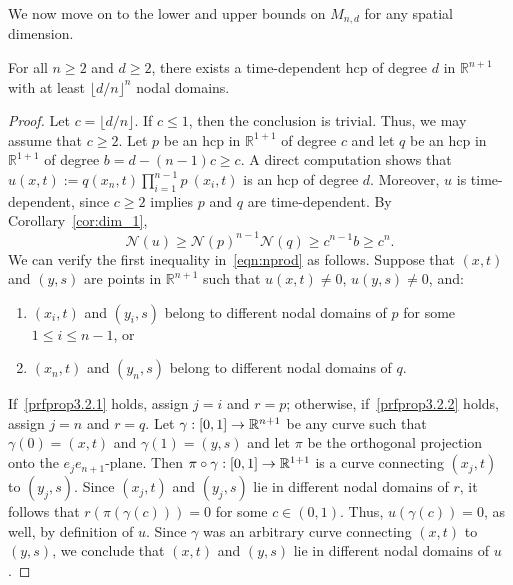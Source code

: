 \documentclass[10pt]{amsart}
\theoremstyle{definition}\newtheorem{defi}[theo]{Definition}\newtheorem{rema}[theo]{Remark}\newtheorem{exam}[theo]{Example}\newtheorem{exem}[theo]{Example}\newtheorem{nota}[theo]{Notation}
\newcommand{\R}{\mathbb{R}}
\newcommand{\nodal}{\mathcal{N}}
\newcommand*{\relabel}{
\renewcommand{\labelenumi}{(\theenumi)}}
\newcommand*{\alphenumi}{
\renewcommand*{\theenumi}{\alph{enumi}}\relabel}
\renewcommand*{\to}{\mathchoice{\longrightarrow}{\rightarrow}{\rightarrow}{\rightarrow}}
\begin{document}
We now move on to the lower and upper bounds on $M_{n,d}$ for any spatial dimension.

\begin{prop}\label{prop:courant_hcp}
For all $n\geq 2$ and $d\geq 2$, there exists a time-dependent hcp of degree $d$ in $\R^{n+1}$ with at least $\lfloor d/n\rfloor^n$ nodal domains.
\end{prop}
\begin{proof}
Let $c = \lfloor d/n \rfloor$. If $c\leq 1$, then the conclusion is trivial. Thus, we may assume that $c\geq 2$. Let $p$ be an hcp in $\R^{1+1}$ of degree $c$ and let $q$ be an hcp in $\R^{1+1}$ of degree $b=d - (n-1)c \ge c$. A direct computation shows that $u(x,t):= q(x_n,t)\prod_{i=1}^{n-1} p~(x_i, t)$ is an hcp of degree $d$. Moreover, $u$ is time-dependent, since $c\geq 2$ implies $p$ and $q$ are time-dependent. By Corollary~\ref{cor:dim_1},
\begin{equation}\label{eqn:nprod}
\nodal(u) \ge \nodal(p)^{n-1}\nodal(q)\geq c^{n-1}b\geq c^n.
\end{equation}
We can verify the first inequality in~\eqref{eqn:nprod} as follows. Suppose that $(x,t)$ and $(y,s)$ are points in $\R^{n+1}$ such that $u(x,t)\neq 0$, $u(y,s)\neq 0$, and:
\begin{enumerate}\alphenumi
\item\label{prfprop3.2.1}
$(x_i,t)$ and $(y_i,s)$ belong to different nodal domains of $p$ for some $1\leq i\leq n-1$, or
\item\label{prfprop3.2.2}
$(x_n,t)$ and $(y_n,s)$ belong to different nodal domains of $q$.
\end{enumerate}
If~\eqref{prfprop3.2.1} holds, assign $j=i$ and $r=p$; otherwise, if~\eqref{prfprop3.2.2} holds, assign $j=n$ and $r=q$. Let $\gamma:[0,1]\to\R^{n+1}$ be any curve such that $\gamma(0)=(x,t)$ and $\gamma(1)=(y,s)$ and let $\pi$ be the orthogonal projection onto the $e_je_{n+1}$-plane. Then $\pi\circ \gamma:[0,1]\to\R^{1+1}$ is a curve connecting $(x_j,t)$ to $(y_j,s)$. Since $(x_j,t)$ and $(y_j,s)$ lie in different nodal domains of $r$, it follows that $r(\pi(\gamma(c)))=0$ for some $c\in(0,1)$. Thus, $u(\gamma(c))=0$, as well, by definition of $u$. Since $\gamma$ was an arbitrary curve connecting $(x,t)$ to $(y,s)$, we conclude that $(x,t)$ and $(y,s)$ lie in different nodal domains of $u$.


\end{proof}
\end{document}
